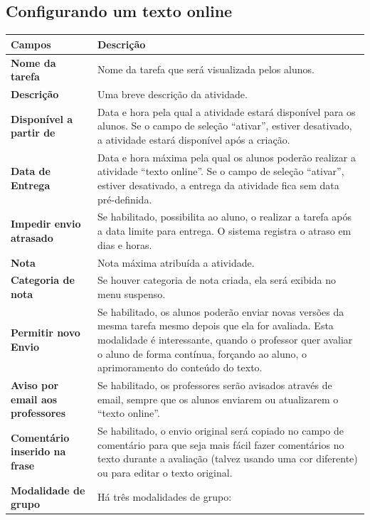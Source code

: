\subsection{Configurando um texto online}
\begin{longtable}{p{6cm}|p{9cm}}
     \hline
     \rowcolor[rgb]{0.8,0.8,0.8} \textbf{Campos} &  \textbf{Descrição}\\\hline
    \textbf{Nome da tarefa} & Nome da tarefa que será visualizada pelos alunos. \\\hline
    \textbf{Descrição} &Uma breve descrição da atividade. \\\hline
    \textbf{Disponível a partir de} & Data e hora pela qual a atividade estará disponível para os alunos. Se o campo de seleção “ativar”, estiver desativado, a atividade estará disponível após a criação.\\\hline
    \textbf{Data de Entrega} & Data e hora máxima pela qual os alunos poderão realizar a atividade “texto online”. Se o campo de seleção “ativar”, estiver desativado, a entrega da atividade fica sem data pré-definida.\\\hline
    \textbf{Impedir envio atrasado} & Se habilitado, possibilita ao aluno, o realizar a tarefa após a data limite para entrega. O sistema registra o atraso em dias e horas.\\\hline
    \textbf{Nota} & Nota máxima atribuída a atividade. \\\hline
    \textbf{Categoria de nota} & Se houver categoria de nota criada, ela será exibida no menu suspenso. \\\hline
    \textbf{Permitir novo Envio} &Se habilitado, os alunos poderão enviar novas versões da mesma tarefa mesmo depois que ela for avaliada. Esta modalidade é interessante, quando o professor quer avaliar o aluno de forma contínua, forçando ao aluno, o aprimoramento do conteúdo do texto.\\\hline
    \textbf{Aviso por email aos professores} &Se habilitado, os professores serão avisados através de email, sempre que os alunos enviarem ou atualizarem o “texto online”.\\\hline
    \textbf{Comentário inserido na frase} & Se habilitado, o envio original será copiado no campo de comentário para que seja mais fácil fazer comentários no texto durante a avaliação (talvez usando uma cor diferente) ou para editar o texto original. \\\hline
    \textbf{Modalidade de grupo} & Há três modalidades de grupo:\\

\end{longtable}
